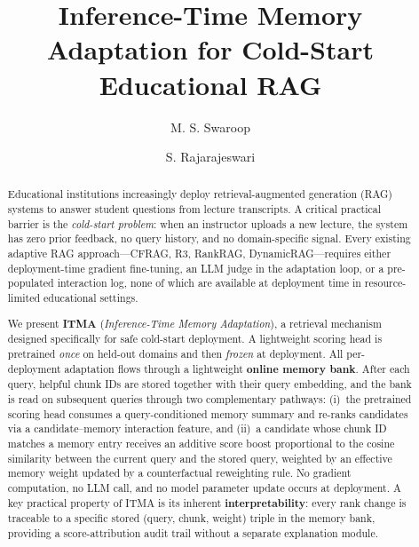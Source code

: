 \documentclass[preprint,12pt]{elsarticle}
\begin{document}
\begin{frontmatter}

\title{Inference-Time Memory Adaptation for Cold-Start Educational RAG}

\author[1]{M. S. Swaroop}
\author[1]{S. Rajarajeswari}

\address[1]{Department of Computer Science and Engineering,
M\,S Ramaiah Institute of Technology, VTU, Bengaluru 560\,054, India}

\begin{abstract}
Educational institutions increasingly deploy retrieval-augmented generation
(RAG) systems to answer student questions from lecture transcripts.  A critical
practical barrier is the \emph{cold-start problem}: when an instructor uploads
a new lecture, the system has zero prior feedback, no query history, and no
domain-specific signal.  Every existing adaptive RAG approach---CFRAG, R3,
RankRAG, DynamicRAG---requires either deployment-time gradient fine-tuning, an
LLM judge in the adaptation loop, or a pre-populated interaction log, none of
which are available at deployment time in resource-limited educational settings.

We present \textbf{ITMA} (\emph{Inference-Time Memory Adaptation}), a
retrieval mechanism designed specifically for safe cold-start deployment.
A lightweight scoring head is pretrained \emph{once} on held-out domains and
then \emph{frozen} at deployment.  All per-deployment adaptation flows
through a lightweight \textbf{online memory bank}.  After each query, helpful
chunk IDs are stored together with their query embedding, and the bank is
read on subsequent queries through two complementary pathways: (i)~the
pretrained scoring head consumes a query-conditioned memory summary and
re-ranks candidates via a candidate--memory interaction feature, and (ii)~a
candidate whose chunk ID matches a memory entry receives an additive score
boost proportional to the cosine similarity between the current query and
the stored query, weighted by an effective memory weight updated by a
counterfactual reweighting rule.  No gradient computation, no LLM call, and
no model parameter update occurs at deployment.  A key practical property of ITMA is
its inherent \textbf{interpretability}: every rank change is traceable to a
specific stored (query, chunk, weight) triple in the memory bank, providing a
score-attribution audit trail without a separate explanation module.


\end{abstract}
\end{frontmatter}
\end{document}
